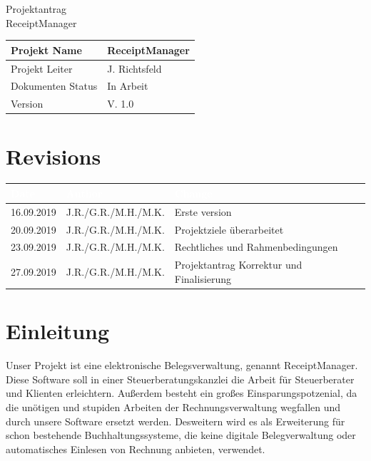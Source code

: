 \documentclass[12pt]{article}
\theoremstyle{definition}
\newcommand{\projectname}{ReceiptManager}
\newcommand{\productname}{ReceiptManager}
\newcommand{\projectleader}{J. Richtsfeld}
\newcommand{\documentstatus}{In Arbeit}
\newcommand{\version}{V. 1.0}
\begin{document}
\begin{titlepage}
\begin{flushright}
\end{flushright}



\vspace{10em}

\begin{center}
{\Huge Projektantrag} \\[3em]
{\LARGE \productname} \\[3em]
\end{center}

\begin{flushleft}
\begin{tabular}{|l|l|}
\hline
Projekt Name & \projectname \\ \hline
Projekt Leiter & \projectleader \\ \hline
Dokumenten Status & \documentstatus \\ \hline
Version & \version \\ \hline
\end{tabular}
\end{flushleft}

\end{titlepage}
\section*{Revisions}
\begin{tabular}{|l|l|l|}
\hline
\cellcolor[gray]{0.5}\textcolor{white}{Date} & \cellcolor[gray]{0.5}\textcolor{white}{Author} & \cellcolor[gray]{0.5}\textcolor{white}{Change} \\ \hline
16.09.2019&J.R./G.R./M.H./M.K.&Erste version \\ \hline
20.09.2019&J.R./G.R./M.H./M.K.&Projektziele überarbeitet \\ \hline
23.09.2019&J.R./G.R./M.H./M.K.&Rechtliches und Rahmenbedingungen \\ \hline
27.09.2019&J.R./G.R./M.H./M.K.&Projektantrag Korrektur und Finalisierung \\ \hline
\end{tabular}
\pagebreak
\tableofcontents
\pagebreak

\section{Einleitung}

Unser Projekt ist eine elektronische Belegsverwaltung, genannt ReceiptManager. Diese Software soll in einer Steuerberatungskanzlei die Arbeit für Steuerberater und Klienten erleichtern. Außerdem besteht ein großes Einsparungspotzenial, da die unötigen und stupiden Arbeiten der Rechnungsverwaltung wegfallen und durch unsere Software ersetzt werden. Desweitern wird es als Erweiterung für schon bestehende Buchhaltungssysteme, die keine digitale Belegverwaltung oder automatisches Einlesen von Rechnung anbieten, verwendet.
\pagebreak
\end{document}

